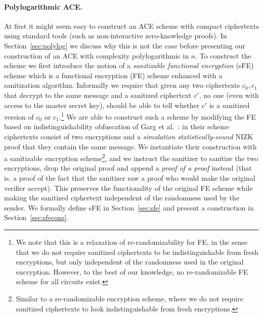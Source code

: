 \documentclass{llncs}
\begin{document}
\paragraph{Polylogarithmic ACE.} At first it might seem easy to construct an ACE scheme with compact ciphertexts using standard tools (such as non-interactive zero-knowledge proofs). In Section~\ref{sec:polylog} we discuss why this is not the case before presenting our construction of an ACE with complexity polylogarithmic in $n$. To construct the scheme we first introduce the notion of a \emph{sanitizable functional encryption} (sFE) scheme which is a functional encryption (FE) scheme enhanced with a sanitization algorithm. Informally we require that given any two ciphertexts $c_0,c_1$ that decrypt to the same message and a sanitized ciphertext $c'$, no one (even with access to the master secret key), should be able to tell whether $c'$ is a sanitized version of $c_0$ or $c_1$.\footnote{We note that this is a relaxation of re-randomizability for FE, in the sense that we do not require sanitized ciphertexts to be indistinguishable from fresh encryptions, but only independent of the randomness used in the original encryption. However, to the best of our knowledge, no re-randomizable FE scheme for all circuits exist.} We are able to construct such a scheme by modifying the FE based on indistinguishability obfuscation of Garg et al.~\cite{DBLP:conf/focs/GargGH0SW13}: in their scheme ciphertexts consist of two encryptions and a \emph{simulation statistically-sound} NIZK proof that they contain the same message. We instantiate their construction with a sanitizable encryption scheme\footnote{Similar to a re-randomizable encryption scheme, where we do not require sanitized ciphertexts to look indistinguishable from fresh encryptions.}, and we instruct the sanitizer to sanitize the two encryptions, drop the original proof and append a \emph{proof of a proof} instead (that is, a proof of the fact that the sanitizer saw a proof who would make the original verifier accept). This preserves the functionality of the original FE scheme while making the sanitized ciphertext independent of the randomness used by the sender. 
We formally define sFE in Section~\ref{sec:sfe} and present a construction in Section~\ref{sec:sfecons}.
\end{document}
